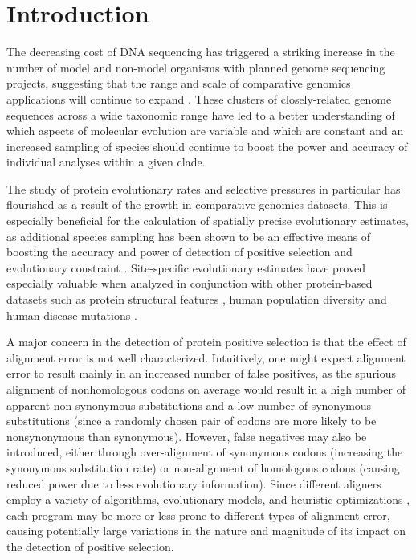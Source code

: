 \documentclass{article}
\begin{document}




\section*{Introduction}

The decreasing cost of DNA sequencing has triggered a striking
increase in the number of model and non-model organisms with planned
genome sequencing projects, suggesting that the range and scale of
comparative genomics applications will continue to expand
\citep{Green20072x,2007Identification}. These clusters of
closely-related genome sequences across a wide taxonomic range have
led to a better understanding of which aspects of molecular evolution
are variable and which are constant \citep{Wolf2009Nonlinear} and an
increased sampling of species should continue to boost the power and
accuracy of individual analyses within a given clade.

The study of protein evolutionary rates and selective pressures in
particular has flourished as a result of the growth in comparative
genomics datasets. This is especially beneficial for the calculation
of spatially precise evolutionary estimates, as additional species
sampling has been shown to be an effective means of boosting the
accuracy and power of \sw detection of positive selection and
evolutionary constraint
\citep{Anisimova2001Accuracy,Massingham2005Detecting}. Site-specific
evolutionary estimates have proved especially valuable when analyzed
in conjunction with other protein-based datasets such as protein
structural features \citep{Lin2007Proportion,Ramsey2011Relationship},
human population diversity \citep{2010Map} and human disease
mutations \citep{Arbiza2006Selective}.

A major concern in the detection of protein positive selection is that
the effect of alignment error is not well characterized. Intuitively,
one might expect alignment error to result mainly in an increased
number of false positives, as the spurious alignment of nonhomologous
codons on average would result in a high number of apparent
non-synonymous substitutions and a low number of synonymous
substitutions (since a randomly chosen pair of codons are more likely
to be nonsynonymous than synonymous). However, false negatives may
also be introduced, either through over-alignment of synonymous codons
(increasing the synonymous substitution rate) or non-alignment of
homologous codons (causing reduced power due to less evolutionary
information). Since different aligners employ a variety of algorithms,
evolutionary models, and heuristic optimizations
\citep{Notredame2007Recent}, each program may be more or less prone to
different types of alignment error, causing potentially large
variations in the nature and magnitude of its impact on the detection
of positive selection.
\end{document}
